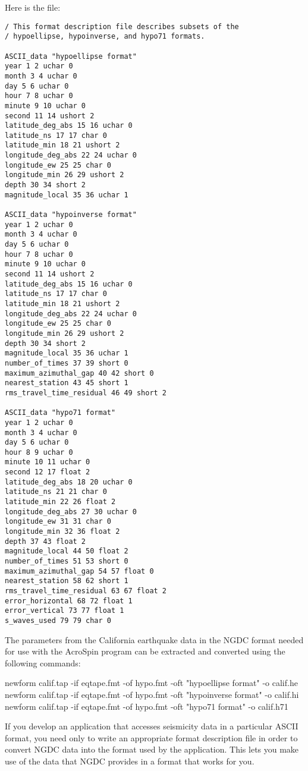 Here is the  file:
\nopagebreak
\T\bgroup
\T\footnotesize
\begin{verbatim}
/ This format description file describes subsets of the 
/ hypoellipse, hypoinverse, and hypo71 formats.

ASCII_data "hypoellipse format"
year 1 2 uchar 0
month 3 4 uchar 0
day 5 6 uchar 0
hour 7 8 uchar 0
minute 9 10 uchar 0
second 11 14 ushort 2
latitude_deg_abs 15 16 uchar 0
latitude_ns 17 17 char 0
latitude_min 18 21 ushort 2 
longitude_deg_abs 22 24 uchar 0
longitude_ew 25 25 char 0
longitude_min 26 29 ushort 2 
depth 30 34 short 2
magnitude_local 35 36 uchar 1

ASCII_data "hypoinverse format"
year 1 2 uchar 0
month 3 4 uchar 0
day 5 6 uchar 0
hour 7 8 uchar 0
minute 9 10 uchar 0
second 11 14 ushort 2
latitude_deg_abs 15 16 uchar 0
latitude_ns 17 17 char 0
latitude_min 18 21 ushort 2 
longitude_deg_abs 22 24 uchar 0
longitude_ew 25 25 char 0
longitude_min 26 29 ushort 2 
depth 30 34 short 2
magnitude_local 35 36 uchar 1
number_of_times 37 39 short 0
maximum_azimuthal_gap 40 42 short 0
nearest_station 43 45 short 1
rms_travel_time_residual 46 49 short 2

ASCII_data "hypo71 format"
year 1 2 uchar 0
month 3 4 uchar 0
day 5 6 uchar 0
hour 8 9 uchar 0
minute 10 11 uchar 0
second 12 17 float 2
latitude_deg_abs 18 20 uchar 0
latitude_ns 21 21 char 0
latitude_min 22 26 float 2 
longitude_deg_abs 27 30 uchar 0
longitude_ew 31 31 char 0
longitude_min 32 36 float 2 
depth 37 43 float 2
magnitude_local 44 50 float 2
number_of_times 51 53 short 0
maximum_azimuthal_gap 54 57 float 0
nearest_station 58 62 short 1
rms_travel_time_residual 63 67 float 2
error_horizontal 68 72 float 1
error_vertical 73 77 float 1
s_waves_used 79 79 char 0 
\end{verbatim}
\T\egroup

The parameters from the California earthquake data in the NGDC format
needed for use with the AcroSpin program can be extracted and
converted using the following commands:

\begin{example}
newform calif.tap -if eqtape.fmt -of hypo.fmt 
       -oft "hypoellipse format" -o calif.he
newform calif.tap -if eqtape.fmt -of hypo.fmt 
       -oft "hypoinverse format" -o calif.hi
newform calif.tap -if eqtape.fmt -of hypo.fmt 
       -oft "hypo71 format" -o calif.h71 
\end{example}

If you develop an application that accesses seismicity data in a
particular ASCII format, you need only to write an appropriate format
description file in order to convert NGDC data into the format used by
the application. This lets you make use of the data that NGDC provides
in a format that works for you.




